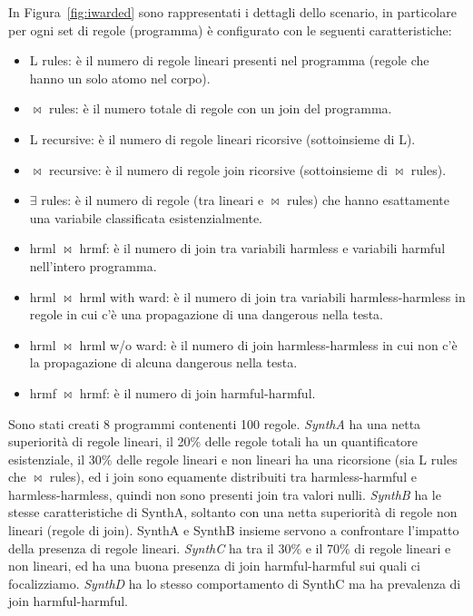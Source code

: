 In Figura~\ref{fig:iwarded} sono rappresentati i dettagli dello scenario, in particolare per ogni set di regole (programma) è configurato con le seguenti caratteristiche:
\begin{itemize}
	\item L rules: è il numero di regole lineari presenti nel programma (regole che hanno un solo atomo nel corpo).
	\item $\bowtie$ rules: è il numero totale di regole con un join del programma.
	\item L recursive: è il numero di regole lineari ricorsive (sottoinsieme di L).
	\item $\bowtie$ recursive: è il numero di regole join ricorsive (sottoinsieme di $\bowtie$ rules).
	\item $\exists$ rules: è il numero di regole (tra lineari e $\bowtie$ rules) che hanno esattamente una variabile classificata esistenzialmente.
	\item hrml $\bowtie$ hrmf: è il numero di join tra variabili harmless e variabili harmful nell'intero programma.
	\item hrml $\bowtie$ hrml with ward: è il numero di join tra variabili harmless-harmless in regole in cui c'è una propagazione di una dangerous nella testa.
	\item hrml $\bowtie$ hrml w/o ward: è il numero di join harmless-harmless in cui non c'è la propagazione di alcuna dangerous nella testa.
	\item hrmf $\bowtie$ hrmf: è il numero di join harmful-harmful.
\end{itemize}
Sono stati creati 8 programmi contenenti 100 regole. \newline
\emph{SynthA} ha una netta superiorità di regole lineari, il 20\% delle regole totali ha un quantificatore esistenziale, il 30\% delle regole lineari e non lineari ha una ricorsione (sia L rules che $\bowtie$ rules), ed i join sono equamente distribuiti tra harmless-harmful e harmless-harmless, quindi non sono presenti join tra valori nulli. \newline
\emph{SynthB} ha le stesse caratteristiche di SynthA, soltanto con una netta superiorità di regole non lineari (regole di join). SynthA e SynthB insieme servono a confrontare l'impatto della presenza di regole lineari. \newline
\emph{SynthC} ha tra il 30\% e il 70\% di regole lineari e non lineari, ed ha una buona presenza di join harmful-harmful sui quali ci focalizziamo. \emph{SynthD} ha lo stesso comportamento di SynthC ma ha prevalenza di join harmful-harmful. \newline
